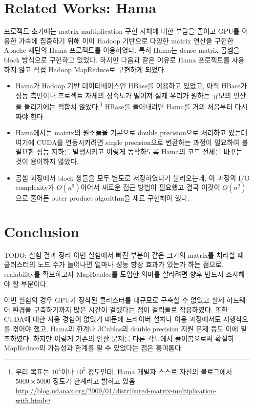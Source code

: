 \documentclass[a4paper]{article}
\begin{document}
\begin{multicols}{2}
\section{Related Works: Hama}
프로젝트 초기에는 matrix multiplication 구현 자체에 대한 부담을 줄이고 GPU를 이용한 가속에 집중하기 위해 이미 Hadoop 기반으로 다양한 matrix 연산을 구현한 Apache 재단의 Hama 프로젝트를 이용하였다.
특히 Hama는 dense matrix 곱셈을 block 방식으로 구현하고 있었다.
하지만 다음과 같은 이유로 Hama 프로젝트를 사용하지 않고 직접 Hadoop MapReduce로 구현하게 되었다.
\begin{itemize}
	\item Hama가 Hadoop 기반 데이터베이스인 HBase를 이용하고 있었고, 아직 HBase가 성능 측면이나 프로젝트 자체의 성숙도가 떨어져 실제 우리가 원하는 규모의 연산을 돌리기에는 적합치 않았다.\footnote{우리 목표는 $10^4$이나 $10^5$ 정도인데, Hama 개발자 스스로 자신의 블로그에서 $5000 \times 5000$ 정도가 한계라고 밝히고 있음.\\\url{http://blog.udanax.org/2009/01/distributed-matrix-multiplication-with.html}}
	HBase를 들어내려면 Hama를 거의 처음부터 다시 짜야 한다.
	\item Hama에서는 matrix의 원소들을 기본으로 double precision으로 처리하고 있는데 여기에 CUDA를 연동시키려면 single precision으로 변환하는 과정이 필요하여 불필요한 성능 저하를 발생시키고 이렇게 동작하도록 Hama의 코드 전체를 바꾸는 것이 용이하지 않았다.
	\item 곱셈 과정에서 block 쌍들을 모두 별도로 저장하였다가 불러오는데, 이 과정의 I/O complexity가 $O(n^3)$이어서 새로운 접근 방법이 필요했고 결국 이것이 $O(n^2)$으로 줄어든 outer product algorithm을 새로 구현해야 했다.
\end{itemize}

\section{Conclusion}
{\color{BurntOrange} TODO: 실험 결과 정리}
이번 실험에서 빠진 부분이 같은 크기의 matrix를 처리할 때 클러스터의 노드 수가 늘어나면 얼마나 성능 향상 효과가 있는가 하는 점으로, scalability를 확보하고자 MapReudce를 도입한 의미를 살리려면 향후 반드시 조사해야 할 부분이다.

이번 실험의 경우 GPU가 장착된 클러스터를 대규모로 구축할 수 없었고 실제 하드웨어 환경을 구축하기까지 많은 시간이 걸렸다는 점이 걸림돌로 작용하였다.
또한 CUDA에 대한 사용 경험이 없었기 때문에 드라이버 설치나 이용 과정에서도 시행착오를 겪어야 했고, Hama의 한계나 JCublas의 double precision 지원 문제 등도 이에 일조하였다.
하지만 이렇게 기존의 연산 문제를 다른 각도에서 풀어봄으로써 확실히 MapReduce의 가능성과 한계를 알 수 있었다는 점은 흥미롭다.


\end{multicols}
\end{document}
